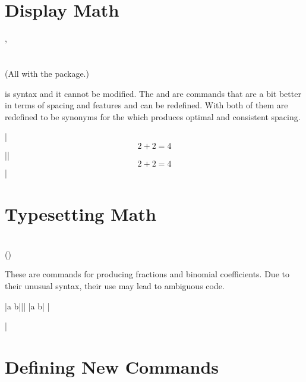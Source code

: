 \NewCommandCopy{\oldsec}{\section}
\ExplSyntaxOff

\section{Display Math}
\instead{
\ai{\&\&}
} {
\ci{[}, \ci{]} \\
\\
\\
(All with the  package.)
}

\ai{\&\&} is  syntax and it cannot be modified. The
 and \ci{[} are  commands that are a bit better
in terms of spacing and features and can be redefined. With  both
of them are redefined to be synonyms for the  which produces
optimal and consistent spacing.

\chto|$$ 2 + 2 = 4 $$||\[ 2 + 2 = 4 \]| %

\section{Typesetting Math}
 {
   \\
   ()
}

These are  commands for producing fractions and binomial
coefficients. Due to their unusual syntax, their use may lead to ambiguous
code.
\begin{chktexignore}
\chto|{a \over b}|||
\chto|{a \choose b}|
|\usepackage{amsmath}
|
\end{chktexignore}

\section{Defining New Commands}\label{sec:def}
 {
   \\
   \\
}

